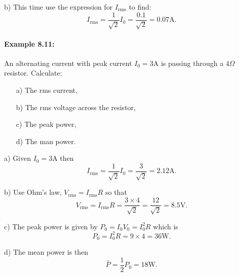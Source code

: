 \documentclass[a4paper,12pt]{book}
\begin{document}
b) This time use the expression for $I_{\text{rms}}$ to find:
\begin{equation*}
I_{\text{rms}}=\frac{1}{\sqrt{2}}I_{0}=\frac{0.1}{\sqrt{2}}=0.07\text{A}.
\end{equation*}

\paragraph{Example 8.11:} An alternating current with peak current $I_{0}=3\text{A}$ is passing through a $4\Omega$ resistor. Calculate:
\begin{itemize}
\setlength{\itemsep}{-5pt}
    \item[a)] The rms current,
    \item[b)] The rms voltage across the resistor,
    \item[c)] The peak power,
    \item[d)] The man power.
\end{itemize}  

a) Given $I_{0}=3\text{A}$ then
\begin{equation*}
I_{\text{rms}}=\frac{1}{\sqrt{2}}I_{0}=\frac{3}{\sqrt{2}}=2.12\text{A}.
\end{equation*}

b) Use Ohm's law, $V_{\text{rms}}=I_{\text{rms}}R$ so that
\begin{equation*}
V_{\text{rms}}=I_{\text{rms}}R=\frac{3\times 4}{\sqrt{2}}=\frac{12}{\sqrt{2}}=8.5\text{V}.
\end{equation*}

c) The peak power is given  by $P_{0}=I_{0}V_{0}=I_{0}^{2}R$ which is
\begin{equation*}
P_{0}=I_{0}^{2}R=9\times 4=36\text{W}.
\end{equation*}

d) The mean power is then
\begin{equation*}
\bar{P}=\frac{1}{2}P_{0}=18\text{W}.
\end{equation*}

\newpage
\end{document}
